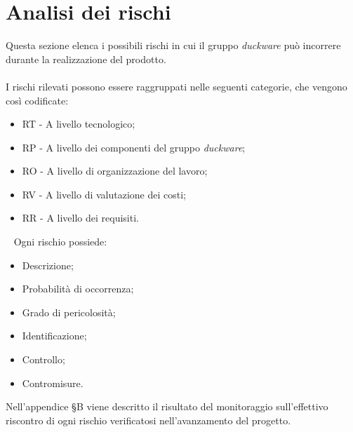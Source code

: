 \clearpage
\section{Analisi dei rischi}
\label{sec:analisi_rischi}
Questa sezione elenca i possibili rischi in cui il gruppo \emph{duckware} può incorrere durante la realizzazione del prodotto.\\
\\
I rischi rilevati possono essere raggruppati nelle seguenti categorie, che vengono così codificate: 
\begin{itemize}
	\item RT - A livello tecnologico; 
	\item RP - A livello dei componenti del gruppo \emph{duckware};
	\item RO - A livello di organizzazione del lavoro;
	\item RV - A livello di valutazione dei costi;
	\item RR - A livello dei requisiti.
\end{itemize}
~
Ogni rischio possiede:
	
\begin{itemize}
	\item Descrizione;
	\item Probabilità di occorrenza;
	\item Grado di pericolosità;
	\item Identificazione;
	\item Controllo;
	\item Contromisure.
\end{itemize}
Nell'appendice §B viene descritto il risultato del monitoraggio sull'effettivo riscontro di ogni rischio verificatosi nell'avanzamento del progetto.

